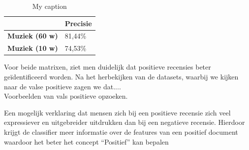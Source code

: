 \begin{table}[h]
\centering
\caption{My caption}
\label{my-label}
\begin{tabular}{l|l|}
\cline{2-2}
                                          & {\bf Precisie} \\ \hline
\multicolumn{1}{|l|}{{\bf Muziek (60 w)}} & 81,44\%        \\ \hline
\multicolumn{1}{|l|}{{\bf Muziek (10 w)}} & 74,53\%        \\ \hline
\end{tabular}
\end{table}

Voor beide matrixen, ziet men duidelijk dat positieve recensies beter ge\"identificeerd worden. Na het herbekijken van de datasets, waarbij we kijken naar de valse positieve zagen we dat....\\

Voorbeelden van vals positieve opzoeken.

Een mogelijk verklaring dat mensen zich bij een positieve recensie zich veel expressiever en uitgebreider uitdrukken dan bij een negatieve recensie. Hierdoor krijgt de classifier meer informatie over de features van een positief document waardoor het beter het concept ``Positief'' kan bepalen 


